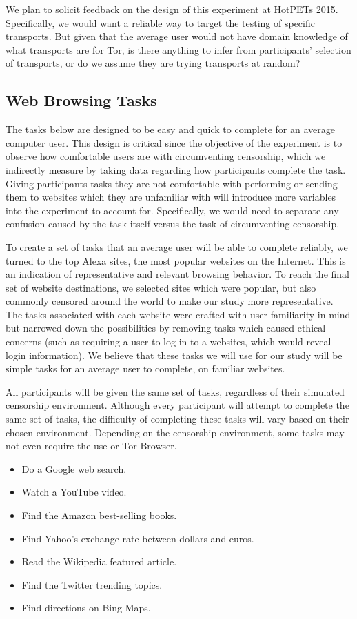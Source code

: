 \documentclass[letterpaper,twocolumn,11pt]{article}
\begin{document}
We plan to solicit feedback on the design of this experiment at HotPETs 2015.
Specifically, we would want a reliable way to target the testing of 
specific transports. But given that the average user would not have domain knowledge of 
what transports are for Tor, is there anything to infer from participants' selection of transports, 
or do we assume they are trying transports at random?

\subsection{Web Browsing Tasks}
\indent \indent The tasks below are designed to be easy and quick to complete for an average
computer user. This design is critical since the objective of the experiment is to observe
how comfortable users are with circumventing censorship, which we indirectly measure
by taking data regarding how participants complete the task. Giving participants tasks 
they are not comfortable with performing or sending them to websites which they are 
unfamiliar with will introduce more variables into the experiment to account for. 
Specifically, we would need to separate any confusion caused by the task itself versus
the task of circumventing censorship. 

To create a set of tasks that an average user will be able to complete reliably, 
we turned to the top Alexa sites, the most popular websites on the Internet. This 
is an indication of representative and relevant browsing behavior. To reach the final
set of website destinations, we selected sites which were popular, but also commonly
censored around the world to make our study more representative. The tasks 
associated with each website were crafted with user familiarity in mind but narrowed 
down the possibilities by removing tasks which caused ethical concerns (such as 
requiring a user to log in to a websites, which would reveal login information).  
We believe that these tasks we will use for our study will be simple tasks for an average 
user to complete, on familiar websites. 

All participants will be given the same set of tasks, regardless of their simulated
censorship environment.  Although every participant will attempt to complete the same 
set of tasks, the difficulty of completing these tasks will vary based on their chosen environment. 
Depending on the censorship environment, some tasks may not even require the use or Tor Browser. 

\begin{itemize} \itemsep1pt \parskip0pt 
\item Do a Google web search.
\item Watch a YouTube video.
\item Find the Amazon best-selling books.
\item Find Yahoo's exchange rate between dollars and euros.
\item Read the Wikipedia featured article.
\item Find the Twitter trending topics.
\item Find directions on Bing Maps.
\end{itemize}
\end{document}
